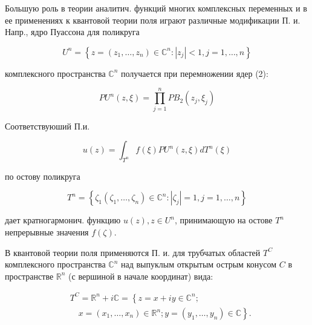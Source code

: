 \documentclass[10pt]{article}
\begin{document}
Большую роль в теории аналитич. функций многих комплексных переменных и в ее применениях к квантовой теории поля играют различные модификации П. и. Напр., ядро Пуассона для поликруга



\[

U^{n}=\left\{z=\left(z_{1}, \ldots, z_{n}\right) \in \mathbb{C}^{n}:\left|z_{j}\right|<1, j=1, \ldots, n\right\}

\]



комплексного пространства $\mathbb{C}^{n}$ получается при перемножении ядер (2):



\[

P U^{n}(z, \xi)=\prod_{j=1}^{n} P B_{2}\left(z_{j}, \xi_{j}\right)

\]



Соответствуюший П.и.



\[

u(z)=\int_{T^{n}} f(\xi) P U^{n}(z, \xi) d T^{n}(\xi)

\]



по остову поликруга



\[

T^{n}=\left\{\zeta_{1}\left(\zeta_{1}, \ldots, \zeta_{n}\right) \in \mathbb{C}^{n}:\left|\zeta_{j}\right|=1, j=1, \ldots, n\right\}

\]



дает кратногармонич. функцию $u(z), z \in U^{n}$, принимающую на остове $T^{n}$ непрерывные значения $f(\zeta)$.



В квантовой теории поля применяются П. и. для трубчатых областей $T^{C}$ комплексного пространства $\mathbb{C}^{n}$ над выпуклым открытым острым конусом $C$ в пространстве $\mathbb{R}^{n}$ (с вершиной в начале координат) вида:



\[

\begin{aligned}

& T^{C}=\mathbb{R}^{n}+i \mathbb{C}=\left\{z=x+i y \in \mathbb{C}^{n} ;\right. \\

& \left.\quad x=\left(x_{1}, \ldots, x_{n}\right) \in \mathbb{R}^{n} ; y=\left(y_{1}, \ldots, y_{n}\right) \in \mathbb{C}\right\} .

\end{aligned}

\]
\end{document}
